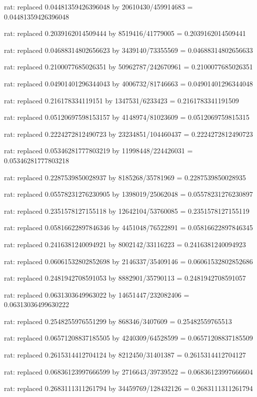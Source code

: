 \documentclass[a4paper,10pt]{article}
\begin{document}
\begin{eulernotebook}
\begin{eulercomment}
\begin{eulercomment}
\begin{eulercomment}
\begin{eulercomment}
\begin{eulercomment}
\begin{eulercomment}
\begin{eulercomment}
\begin{eulercomment}
\begin{eulercomment}
\begin{eulercomment}
\begin{eulercomment}
\begin{eulercomment}
\begin{eulercomment}
\begin{eulercomment}
\begin{eulercomment}
\begin{eulercomment}
\begin{euleroutput}
  rat: replaced 0.04481359426396048 by 20610430/459914683 = 0.04481359426396048
  
  rat: replaced 0.2039162014509444 by 8519416/41779005 = 0.2039162014509441
  
  rat: replaced 0.04688314802656623 by 3439140/73355569 = 0.04688314802656633
  
  rat: replaced 0.2100077685026351 by 50962787/242670961 = 0.2100077685026351
  
  rat: replaced 0.04901401296344043 by 4006732/81746663 = 0.04901401296344048
  
  rat: replaced 0.216178334119151 by 1347531/6233423 = 0.2161783341191509
  
  rat: replaced 0.05120697598153157 by 4148974/81023609 = 0.0512069759815315
  
  rat: replaced 0.2224272812490723 by 23234851/104460437 = 0.2224272812490723
  
  rat: replaced 0.05346281777803219 by 11998448/224426031 = 0.05346281777803218
  
  rat: replaced 0.2287539850028937 by 8185268/35781969 = 0.2287539850028935
  
  rat: replaced 0.05578231276230905 by 1398019/25062048 = 0.05578231276230897
  
  rat: replaced 0.2351578127155118 by 12642104/53760085 = 0.2351578127155119
  
  rat: replaced 0.05816622897846346 by 4451048/76522891 = 0.05816622897846345
  
  rat: replaced 0.2416381240094921 by 8002142/33116223 = 0.2416381240094923
  
  rat: replaced 0.06061532802852698 by 2146337/35409146 = 0.06061532802852686
  
  rat: replaced 0.2481942708591053 by 8882901/35790113 = 0.2481942708591057
  
  rat: replaced 0.0631303649963022 by 14651447/232082406 = 0.06313036499630222
  
  rat: replaced 0.2548255976551299 by 868346/3407609 = 0.25482559765513
  
  rat: replaced 0.06571208837185505 by 4240309/64528599 = 0.06571208837185509
  
  rat: replaced 0.2615314412704124 by 8212450/31401387 = 0.2615314412704127
  
  rat: replaced 0.06836123997666599 by 2716643/39739522 = 0.06836123997666604
  
  rat: replaced 0.2683111311261794 by 34459769/128432126 = 0.2683111311261794
  

\end{euleroutput}
\end{eulercomment}
\end{eulercomment}
\end{eulercomment}
\end{eulercomment}
\end{eulercomment}
\end{eulercomment}
\end{eulercomment}
\end{eulercomment}
\end{eulercomment}
\end{eulercomment}
\end{eulercomment}
\end{eulercomment}
\end{eulercomment}
\end{eulercomment}
\end{eulercomment}
\end{eulercomment}
\end{eulernotebook}
\end{document}
